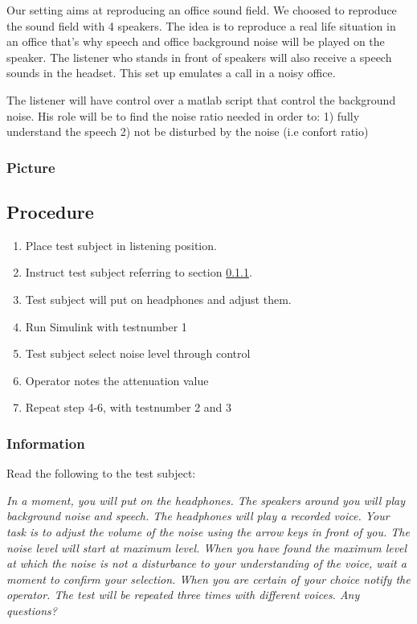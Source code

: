 Our setting aims at reproducing an office sound field. We choosed to reproduce the sound field with 4 speakers. 
The idea is to reproduce a real life situation in an office that's why speech and office background noise will be played on the speaker. 
The listener who stands in front of speakers will also receive a speech sounds in the headset. This set up emulates a call in a noisy office.

The listener will have control over a matlab script that control the background noise. His role will be to find the noise ratio needed in order to: 1) fully understand the speech 2) not be disturbed by the noise (i.e confort ratio)

\subsubsection{Picture}
\vspace{1cm}
\subsection{Procedure}

\begin{enumerate}
	\item Place test subject in listening position.
	\item Instruct test subject referring to section \ref{subsubsec:attenuationInformation}.
	\item Test subject will put on headphones and adjust them.
	\item Run Simulink  with testnumber 1
	\item Test subject select noise level through control
	\item Operator notes the attenuation value
	\item Repeat step 4-6, with testnumber 2 and 3
\end{enumerate}

\subsubsection{Information}\label{subsubsec:attenuationInformation}
Read the following to the test subject:

\textit{In a moment, you will put on the headphones. The speakers around you will play background noise and speech. The headphones will play a recorded voice. Your task is to adjust the volume of the noise using the arrow keys in front of you. The noise level will start at maximum level. When you have found the maximum level at which the noise is not a disturbance to your understanding of the voice, wait a moment to confirm your selection. When you are certain of your choice notify the operator. The test will be repeated three times with different voices. Any questions?}


